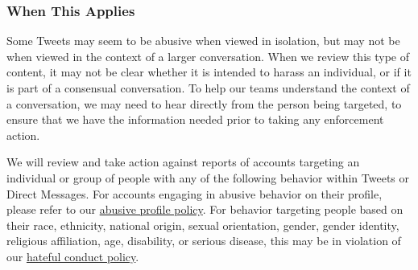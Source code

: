 \subsubsection{When This Applies}

Some Tweets may seem to be abusive when viewed in isolation, but may not be when
viewed in the context of a larger conversation. When we review this type of
content, it may not be clear whether it is intended to harass an individual, or
if it is part of a consensual conversation. To help our teams understand the
context of a conversation, we may need to hear directly from the person being
targeted, to ensure that we have the information needed prior to taking any
enforcement action.

We will review and take action against reports of accounts targeting an
individual or group of people with any of the following behavior within Tweets
or Direct Messages. For accounts engaging in abusive behavior on their profile,
please refer to our
\href{https://web.archive.org/web/20220905021323/https://help.twitter.com/en/rules-and-policies/abusive-profile.html}{abusive
profile policy}. For behavior targeting people based on their race, ethnicity,
national origin, sexual orientation, gender, gender identity, religious
affiliation, age, disability, or serious disease, this may be in violation of
our
\href{https://web.archive.org/web/20220905021323/https://help.twitter.com/en/rules-and-policies/hateful-conduct-policy.html}{hateful
conduct policy}.

